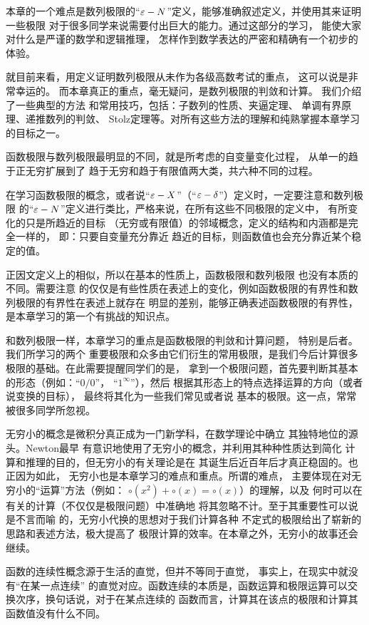 本章的一个难点是{\kaishu 数列极限的“$\varepsilon-N$”定义}，能够准确叙述定义，并使用其来证明一些极限
对于很多同学来说需要付出巨大的能力。通过这部分的学习，
能使大家对什么是严谨的数学和逻辑推理，
怎样作到数学表达的严密和精确有一个初步的体验。

就目前来看，用定义证明数列极限从未作为各级高数考试的重点，
这可以说是非常幸运的。
而本章真正的重点，毫无疑问，是数列极限的判敛和计算。
我们介绍了一些典型的方法
和常用技巧，包括：{\kaishu 子数列的性质、夹逼定理、
单调有界原理、递推数列的判敛、
Stolz定理等}。对所有这些方法的理解和纯熟掌握本章学习的目标之一。

函数极限与数列极限最明显的不同，就是所考虑的自变量变化过程，
从单一的趋于正无穷扩展到了
趋于无穷和趋于有限值两大类，共六种不同的过程。

在学习函数极限的概念，或者说“$\varepsilon-X$”（“$\varepsilon-\delta$”）定义时，一定要注意和数列极限
的“$\varepsilon-N$”定义进行类比，严格来说，在所有这些不同极限的定义中，
有所变化的只是所趋近的目标
（无穷或有限值）的邻域概念，定义的结构和内涵都是完全一样的，
即：{\kaishu 只要自变量充分靠近
趋近的目标，则函数值也会充分靠近某个稳定的值。}

正因文定义上的相似，所以在基本的性质上，函数极限和数列极限
也没有本质的不同。需要注意
的仅仅是有些性质在表述上的变化，例如{\kaishu 函数极限的有界性}和数列极限的有界性在表述上就存在
明显的差别，能够正确表述函数极限的有界性，
是本章学习的第一个有挑战的知识点。

和数列极限一样，本章学习的重点是函数极限的判敛和计算问题，
特别是后者。我们所学习的{\kaishu 两个
重要极限和众多由它们衍生的常用极限}，是我们今后计算很多极限的基础。在此需要提醒同学们的是，
拿到一个极限问题，首先要判断其基本的形态（例如：“$0/0$”，
“$1^{\infty}$”），然后
根据其形态上的特点选择运算的方向（或者说变换的目标），
最终将其化为一些我们常见或者说
基本的极限。这一点，常常被很多同学所忽视。

无穷小的概念是微积分真正成为一门新学科，在数学理论中确立
其独特地位的源头。Newton最早
有意识地使用了无穷小的概念，并利用其种种性质达到简化
计算和推理的目的，但无穷小的有关理论是在
其诞生后近百年后才真正稳固的。也正因为如此，
无穷小也是本章学习的难点和重点。所谓的难点，
主要体现在对无穷小的“运算”方法（例如：
$\circ(x^2)+\circ(x)=\circ(x)$）的理解，以及
何时可以在有关的计算（不仅仅是极限问题）中准确地
将其忽略不计。至于其重要性可以说是不言而喻
的，{\kaishu 无穷小代换}的思想对于我们计算各种
不定式的极限给出了崭新的
思路和表述方法，极大提高了
极限计算的效率。在本章之外，无穷小的故事还会继续。

函数的连续性概念源于生活的直觉，但并不等同于直觉，
事实上，在现实中就没有“在某一点连续”
的直觉对应。{\kaishu 函数连续的本质是，函数运算和极限运算可以交换次序}，换句话说，对于在某点连续的
函数而言，计算其在该点的极限和计算其函数值没有什么不同。

